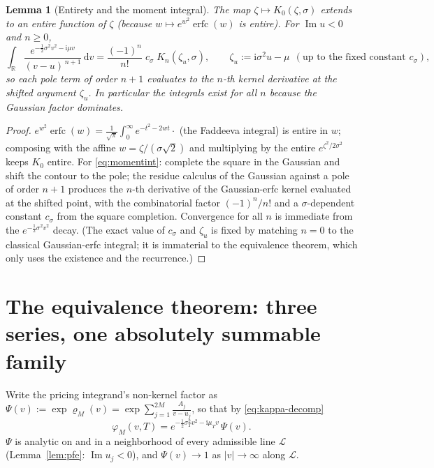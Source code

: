 \documentclass[11pt]{article}
\DeclareMathOperator{\erfc}{erfc}
\DeclareMathOperator{\Imag}{Im}
\newcommand{\R}{\mathbb{R}}
\newcommand{\Ii}{\mathrm{i}}
\newcommand{\dd}{\mathrm{d}}
\theoremstyle{plain}
\newtheorem{lemma}[theorem]{Lemma}
\theoremstyle{definition}
\theoremstyle{remark}
\begin{document}
\begin{lemma}[Entirety and the moment integral]\label{lem:momentint}
The map $\zeta\mapsto K_0(\zeta,\sigma)$ extends to an entire function of $\zeta$
(because $w\mapsto e^{w^2}\erfc(w)$ is entire). For $\Imag u<0$ and $n\ge0$,
\begin{equation}\label{eq:momentint}
   \int_{\R}\frac{e^{-\frac12\sigma^2v^2-\Ii\mu v}}{(v-u)^{\,n+1}}\,\dd v
   =\frac{(-1)^n}{n!}\;c_\sigma\;K_n(\zeta_u,\sigma),
   \qquad \zeta_u:=\Ii\sigma^2 u-\mu\ \ (\text{up to the fixed constant }c_\sigma),
\end{equation}
so each pole term of order $n+1$ evaluates to the $n$-th kernel derivative at the
shifted argument $\zeta_u$. In particular the integrals exist for all $n$ because
the Gaussian factor dominates.
\end{lemma}
\begin{proof}
$e^{w^2}\erfc(w)=\frac{1}{\sqrt\pi}\int_0^\infty e^{-t^2-2wt}\cdot\!\!$ (the
Faddeeva integral) is entire in $w$; composing with the affine
$w=\zeta/(\sigma\sqrt2)$ and multiplying by the entire $e^{\zeta^2/2\sigma^2}$
keeps $K_0$ entire. For \eqref{eq:momentint}: complete the square in the Gaussian
and shift the contour to the pole; the residue calculus of the Gaussian against a
pole of order $n+1$ produces the $n$-th derivative of the Gaussian-erfc kernel
evaluated at the shifted point, with the combinatorial factor $(-1)^n/n!$ and a
$\sigma$-dependent constant $c_\sigma$ from the square completion. Convergence for
all $n$ is immediate from the $e^{-\frac12\sigma^2v^2}$ decay. (The exact value of
$c_\sigma$ and $\zeta_u$ is fixed by matching $n=0$ to the classical Gaussian-erfc
integral; it is immaterial to the equivalence theorem, which only uses the
existence and the recurrence.)
\end{proof}

\section{The equivalence theorem: three series, one absolutely summable family}
\label{sec:equivalence}

Write the pricing integrand's non-kernel factor as
$\Psi(v):=\exp\varrho_M(v)=\exp\!\sum_{j=1}^{2M}\frac{A_j}{v-u_j}$, so that by
\eqref{eq:kappa-decomp}
\begin{equation}\label{eq:phi-split}
   \varphi_M(v,T)=e^{-\frac12\sigma_T^2 v^2-\Ii\mu_T v}\,\Psi(v).
\end{equation}
$\Psi$ is analytic on and in a neighborhood of every admissible line
$\mathcal L$ (Lemma~\ref{lem:pfe}: $\Imag u_j<0$), and $\Psi(v)\to1$ as
$|v|\to\infty$ along $\mathcal L$.
\end{document}
